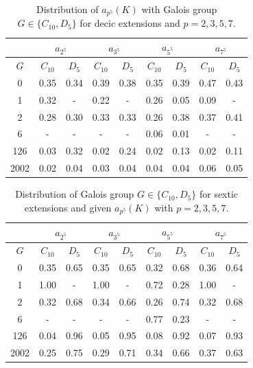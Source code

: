 \documentclass[letterpaper, 10pt]{article}
\newcommand{\1}{\mathds{1}}	%
\theoremstyle{definition}
\theoremstyle{remark}
\begin{document}
\begin{table}[H]
    \begin{center}
        \begin{tabular}{c|c|c|c|c|c|c|c|c}
            \toprule
             & \multicolumn{2}{c|}{$a_{2^5}$} & \multicolumn{2}{c|}{$a_{3^5}$} & \multicolumn{2}{c|}{$a_{5^5}$} & \multicolumn{2}{c}{$a_{7^5}$} \\
            \midrule
            $G$ & $C_{10}$ & $D_5$ & $C_{10}$ & $D_5$ & $C_{10}$ & $D_5$ & $C_{10}$ & $D_5$ \\
            \midrule
            0 & 0.35 & 0.34 & 0.39 & 0.38 & 0.35 & 0.39 & 0.47 & 0.43 \\
            1 & 0.32 & - & 0.22 & - & 0.26 & 0.05 & 0.09 & - \\
            2 & 0.28 & 0.30 & 0.33 & 0.33 & 0.26 & 0.38 & 0.37 & 0.41 \\
            6 & - & - & - & - & 0.06 & 0.01 & - & - \\
            126 & 0.03 & 0.32 & 0.02 & 0.24 & 0.02 & 0.13 & 0.02 & 0.11 \\
            2002 & 0.02 & 0.04 & 0.03 & 0.04 & 0.04 & 0.04 & 0.06 & 0.05 \\
            \bottomrule
        \end{tabular}
        \caption{Distribution of $a_{p^5}(K)$ with Galois group $G \in \{C_{10}, D_5\}$ for decic extensions and $p = 2, 3, 5, 7$.}
        \label{tab:decic_pqu_dist}
    \end{center}
\end{table}

\begin{table}[H]
    \begin{center}
        \begin{tabular}{c|c|c|c|c|c|c|c|c}
            \toprule
             & \multicolumn{2}{c|}{$a_{2^5}$} & \multicolumn{2}{c|}{$a_{3^5}$} & \multicolumn{2}{c|}{$a_{5^5}$} & \multicolumn{2}{c}{$a_{7^5}$} \\
            \midrule
            $G$ & $C_{10}$ & $D_5$ & $C_{10}$ & $D_5$ & $C_{10}$ & $D_5$ & $C_{10}$ & $D_5$ \\
            \midrule
            0 & 0.35 & 0.65 & 0.35 & 0.65 & 0.32 & 0.68 & 0.36 & 0.64 \\
            1 & 1.00 & - & 1.00 & - & 0.72 & 0.28 & 1.00 & - \\
            2 & 0.32 & 0.68 & 0.34 & 0.66 & 0.26 & 0.74 & 0.32 & 0.68 \\
            6 & - & - & - & - & 0.77 & 0.23 & - & - \\
            126 & 0.04 & 0.96 & 0.05 & 0.95 & 0.08 & 0.92 & 0.07 & 0.93 \\
            2002 & 0.25 & 0.75 & 0.29 & 0.71 & 0.34 & 0.66 & 0.37 & 0.63 \\
            \bottomrule
        \end{tabular}
        \caption{Distribution of Galois group $G \in \{C_{10}, D_5\}$ for sextic extensions and given $a_{ p^5}(K)$ with $p = 2, 3, 5, 7$.}
        \label{tab:decic_pqu_dist_G}
    \end{center}
\end{table}
\end{document}

